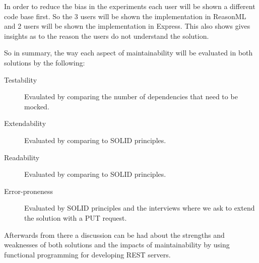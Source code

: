 In order to reduce the bias in the experiments each user will be shown a
different code base first. So the 3 users will be shown the implementation in
ReasonML and 2 users will be shown the implementation in Express. This also
shows gives insights as to the reason the users do not understand the solution.

So in summary, the way each aspect of maintainability will be evaluated in both
solutions by the following:

\begin{description}
    \item [Testability] Evaulated by comparing the number of dependencies that
    need to be mocked. 
    \item [Extendability] Evaluated by comparing to SOLID principles.
    \item [Readability] Evaluated by comparing to SOLID principles.
    \item [Error-proneness] Evaluated by SOLID principles and the interviews
        where we ask to extend the solution with a PUT request.
\end{description}

Afterwards from there a discussion can be had about the strengths and weaknesses
of both solutions and the impacts of maintainability by using functional
programming for developing REST servers.





